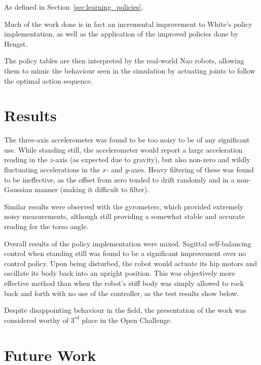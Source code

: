 As defined in Section~\ref{sec:learning_policies},

Much of the work done is in fact an incremental improvement to White's policy implementation, as well as the application of the improved policies done by Hengst.


The policy tables are then interpreted by the real-world Nao robots, allowing them to mimic the behaviour seen in the simulation by actuating joints to follow the optimal action sequence.

\section{Results}
\label{sec:rl_results}

The three-axis accelerometer was found to be too noisy to be of any significant use. While standing still, the accelerometer would report a large acceleration reading in the $z$-axis (as expected due to gravity), but also non-zero and wildly fluctuating accelerations in the $x$- and $y$-axes. Heavy filtering of these was found to be ineffective, as the offset from zero tended to drift randomly and in a non-Gaussian manner (making it difficult to filter).

Similar results were observed with the gyrometers, which provided extremely noisy measurements, although still providing a somewhat stable and accurate reading for the torso angle. 

Overall results of the policy implementation were mixed. Sagittal self-balancing control when standing still was found to be a significant improvement over no control policy. Upon being disturbed, the robot would actuate its hip motors and oscillate its body back into an upright position. This was objectively more effective method than when the robot's stiff body was simply allowed to rock back and forth with no use of the controller, as the test results show below.



Despite disappointing behaviour in the field, the presentation of the work was considered worthy of $3^{rd}$ place in the Open Challenge.


\section{Future Work}

